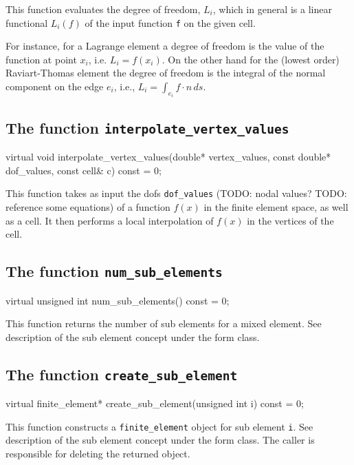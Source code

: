 This function evaluates the degree of freedom, $L_i$,  
which in general is a linear functional 
$L_i(f)$ of the input function \texttt{f}
on the given cell. 
  
For instance, for a Lagrange element a degree of
freedom is the value of the function at point $x_i$, i.e. $L_i = f(x_i)$. 
On the other hand for the (lowest order) Raviart-Thomas element 
the degree of freedom is the integral of the normal component
on the edge $e_i$, i.e., $L_i = \int_{e_i} f\cdot n \, ds$.  

\subsection{The function \texttt{interpolate\_vertex\_values}}

\begin{code}
virtual void interpolate_vertex_values(double* vertex_values,
                                       const double* dof_values,
                                       const cell& c) const = 0;
\end{code}

This function takes as input the dofs \texttt{dof\_values} (TODO: nodal values? TODO: reference some equations)
of a function $f(x)$ in the finite element space, as well as a cell.
It then performs a local interpolation of $f(x)$ in the vertices of the cell.

\subsection{The function \texttt{num\_sub\_elements}}

\begin{code}
virtual unsigned int num_sub_elements() const = 0;
\end{code}

This function returns the number of sub elements for a mixed element.
See description of the sub element concept under the form class.

\subsection{The function \texttt{create\_sub\_element}}

\begin{code}
virtual finite_element* create_sub_element(unsigned int i) const = 0;
\end{code}

This function constructs a \texttt{finite\_element} object for sub element \texttt{i}.
See description of the sub element concept under the form class.
The caller is responsible for deleting the returned object.

